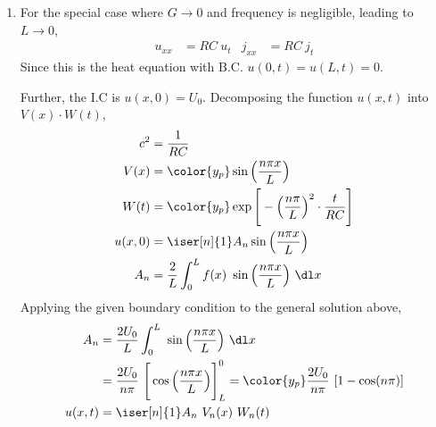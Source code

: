 \begin{enumerate}
\begin{enumerate}
              \item For the special case where $ G \to 0 $ and frequency
                    is negligible, leading to $ L \to 0 $,
                    \begin{align}
                        u_{xx} & = RC\ u_t &
                        j_{xx} & = RC\ j_t
                    \end{align}
                    Since this is the heat equation with B.C. $ u(0, t)
                        = u(L, t) = 0$. \par
                    Further, the I.C is $ u(x, 0) = U_0 $.
                    Decomposing the function $ u(x, t) $ into $ V(x) \cdot W(t)$,
                    \begin{align}
                        c^2     & = \frac{1}{RC}                                     \\
                        V(x)    & = \color{y_p}\sin\Big( \frac{n\pi x}{L} \Big)      \\
                        W(t)    & = \color{y_p}\exp\Bigg[ -\left( \frac{n\pi}{L}
                        \right)^2 \cdot \frac{t}{RC} \Bigg]                          \\
                        u(x, 0) & = \iser[n]{1} A_n \sin\Big( \frac{n\pi x}{L} \Big) \\
                        A_n     & = \frac{2}{L}\int_{0}^{L} f(x)\
                        \sin\Big( \frac{n\pi x}{L} \Big)\ \dl x
                    \end{align}
                    Applying the given boundary condition to the general solution above,
                    \begin{align}
                        A_n     & = \frac{2U_0}{L}\int_{0}^{L}\
                        \sin\Big( \frac{n\pi x}{L} \Big)\ \dl x           \\
                                & = \frac{2U_0}{n\pi}\ \Bigg[ \cos\Big(
                            \frac{n\pi x}{L} \Big)\Bigg]_L^0
                        = \color{y_p} \frac{2U_0}{n\pi}\ [1 - \cos(n\pi)] \\
                        u(x, t) & = \iser[n]{1} A_n\ V_n(x)\ W_n(t)
                    \end{align}


\end{enumerate}
\end{enumerate}
